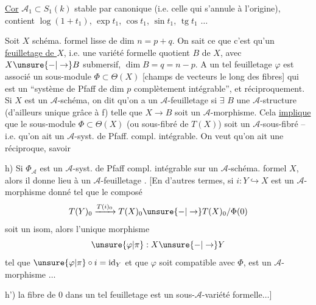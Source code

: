 \uline{Cor} $\mathcal A_1\subset S_1(k)$ stable par  canonique (i.e. celle qui s'annule à l'origine), contient $\log(1+t_1)$, $\exp t_1$, $\cos t_1$, $\sin t_1$, $\operatorname{tg}t_1$ $\ldots$

Soit $X$ schéma. formel lisse de dim $n=p+q$. On sait ce que c'est qu'un \uline{feuilletage de $X$}, i.e. une variété formelle quotient $B$ de $X$, avec $X\unsure{-|\to}B$ submersif, $\dim B=q=n-p$. A un tel feuilletage $\varphi$ est associé un sous-module $\Phi\subset\Theta(X)$ [champs de vecteurs le long des fibres] qui est un ``système de Pfaff de dim $p$ complètement intégrable'', et réciproquement. Si $X$ est un $\mathcal A$-schéma, on dit qu'on a un $\mathcal A$-feuilletage si $\exists$ $B$ une $\mathcal A$-structure (d'ailleurs unique\unsure{\}|)} grâce à f) telle que $X\longrightarrow B$ soit un $\mathcal A$-morphisme. Cela \uline{implique} que le sous-module $\Phi\subset\Theta(X)$ (ou sous-fibré de $T(X)$) soit un $\mathcal A$-sous-fibré -- i.e. qu'on ait un $\mathcal A$-syst. de Pfaff. compl. intégrable. On veut qu'on ait une réciproque, savoir

h) Si $\Phi_{\mathcal A}$ est un $\mathcal A$-syst. de Pfaff compl. intégrable sur un $\mathcal A$-schéma. formel $X$, alors il donne lieu à un $\mathcal A$-feuilletage .
[En d'autres termes, si $i:Y\hookrightarrow X$ est un $\mathcal A$-morphisme donné tel que le composé
\[
T(Y)_0\xrightarrow{T(i)_0}T(X)_0\unsure{-|\to}T(X)_0/\Phi(0)
\]
soit un isom, alors l'unique morphisme
\[
\unsure{\varphi|\pi}:X\unsure{-|\to}Y
\]
tel que $\unsure{\varphi|\pi}\circ i=\operatorname{id}_Y$ et que $\varphi$ soit compatible avec $\Phi$, est un $\mathcal A$-morphisme $\ldots$

h') la fibre de $0$ dans un tel feuilletage est un sous-$\mathcal A$-variété formelle$\ldots$]
